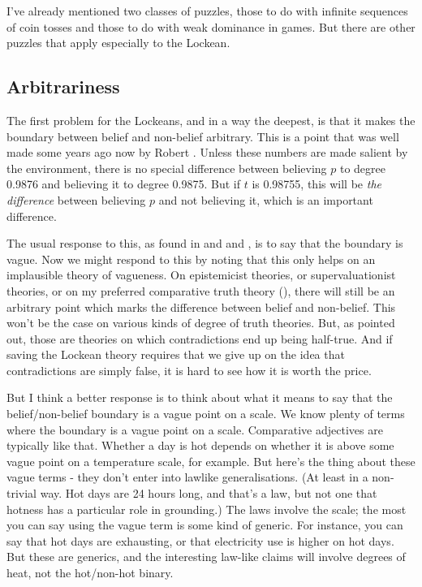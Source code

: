 \documentclass[11pt,]{book}
\begin{document}
I've already mentioned two classes of puzzles, those to do with infinite sequences of coin tosses and those to do with weak dominance in games. But there are other puzzles that apply especially to the Lockean.

\hypertarget{lockearb}{%
\subsection{Arbitrariness}\label{lockearb}}

The first problem for the Lockeans, and in a way the deepest, is that it makes the boundary between belief and non-belief arbitrary. This is a point that was well made some years ago now by Robert \citet[91]{Stalnaker1984}. Unless these numbers are made salient by the environment, there is no special difference between believing \(p\) to degree 0.9876 and believing it to degree 0.9875. But if \(t\) is 0.98755, this will be \emph{the difference} between believing \(p\) and not believing it, which is an important difference.

The usual response to this, as found in \citet[Ch. 4]{Foley1993} and \citet{Hunter1996} and \citet{Lee2017b}, is to say that the boundary is vague. Now we might respond to this by noting that this only helps on an implausible theory of vagueness. On epistemicist theories, or supervaluationist theories, or on my preferred comparative truth theory (\citet{Weatherson2005b}), there will still be an arbitrary point which marks the difference between belief and non-belief. This won't be the case on various kinds of degree of truth theories. But, as \citet{Williamson1994} pointed out, those are theories on which contradictions end up being half-true. And if saving the Lockean theory requires that we give up on the idea that contradictions are simply false, it is hard to see how it is worth the price.

But I think a better response is to think about what it means to say that the belief/non-belief boundary is a vague point on a scale. We know plenty of terms where the boundary is a vague point on a scale. Comparative adjectives are typically like that. Whether a day is hot depends on whether it is above some vague point on a temperature scale, for example. But here's the thing about these vague terms - they don't enter into lawlike generalisations. (At least in a non-trivial way. Hot days are 24 hours long, and that's a law, but not one that hotness has a particular role in grounding.) The laws involve the scale; the most you can say using the vague term is some kind of generic. For instance, you can say that hot days are exhausting, or that electricity use is higher on hot days. But these are generics, and the interesting law-like claims will involve degrees of heat, not the hot/non-hot binary.
\end{document}

